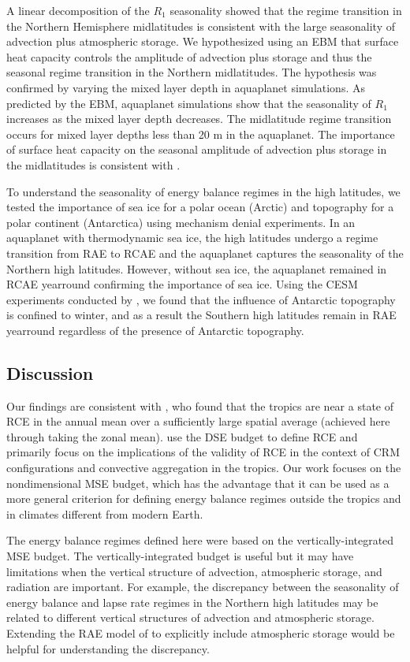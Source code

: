 \documentclass{ametsocV5}
\begin{document}
A linear decomposition of the $R_1$ seasonality showed that the regime transition in the Northern Hemisphere midlatitudes is consistent with the large seasonality of advection plus atmospheric storage. We hypothesized using an EBM that surface heat capacity controls the amplitude of advection plus storage and thus the seasonal regime transition in the Northern midlatitudes. The hypothesis was confirmed by varying the mixed layer depth in aquaplanet simulations. As predicted by the EBM, aquaplanet simulations show that the seasonality of $R_1$ increases as the mixed layer depth decreases. The midlatitude regime transition occurs for mixed layer depths less than 20 m in the aquaplanet. The importance of surface heat capacity on the seasonal amplitude of advection plus storage in the midlatitudes is consistent with \cite{barpanda2020}.

To understand the seasonality of energy balance regimes in the high latitudes, we tested the importance of sea ice for a polar ocean (Arctic) and topography for a polar continent (Antarctica) using mechanism denial experiments. In an aquaplanet with thermodynamic sea ice, the high latitudes undergo a regime transition from RAE to RCAE and the aquaplanet captures the seasonality of the Northern high latitudes. However, without sea ice, the aquaplanet remained in RCAE yearround confirming the importance of sea ice. Using the CESM experiments conducted by \cite{hahn2020}, we found that the influence of Antarctic topography is confined to winter, and as a result the Southern high latitudes remain in RAE yearround regardless of the presence of Antarctic topography.

\subsection{Discussion}
Our findings are consistent with \cite{jakob2019}, who found that the tropics are near a state of RCE in the annual mean over a sufficiently large spatial average (achieved here through taking the zonal mean). \cite{jakob2019} use the DSE budget to define RCE and primarily focus on the implications of the validity of RCE in the context of CRM configurations and convective aggregation in the tropics. Our work focuses on the nondimensional MSE budget, which has the advantage that it can be used as a more general criterion for defining energy balance regimes outside the tropics and in climates different from modern Earth.

The energy balance regimes defined here were based on the vertically-integrated MSE budget. The vertically-integrated budget is useful but it may have limitations when the vertical structure of advection, atmospheric storage, and radiation are important. For example, the discrepancy between the seasonality of energy balance and lapse rate regimes in the Northern high latitudes may be related to different vertical structures of advection and atmospheric storage. Extending the RAE model of \cite{cronin2016} to explicitly include atmospheric storage would be helpful for understanding the discrepancy. 
\end{document}
